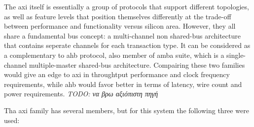 \label{amba}
The \gls{axi} itself is essentially a group of protocols that support different topologies,
as well as feature levels that position themselves differently at the trade-off 
between performance and functionality versus silicon area.
However, they all share a fundamental bus concept: 
a multi-channel non shared-bus architecture that contains seperate
channels for each \gls{transaction} type. It can be considered as a complementary
to \gls{ahb} protocol, also member of \gls{amba} suite, 
which is a single-channel multiple-master shared-bus architecture. 
Compairing these two families would give an edge to \gls{axi} in
throughtput performance and clock frequency requirements, while \gls{ahb} would favor
better in terms of latency, wire count and power requirements. 
\emph{TODO: να βρω αξιόπιστη πηγή}

Tha \gls{axi} family has several members, but for this system the following three were used:
